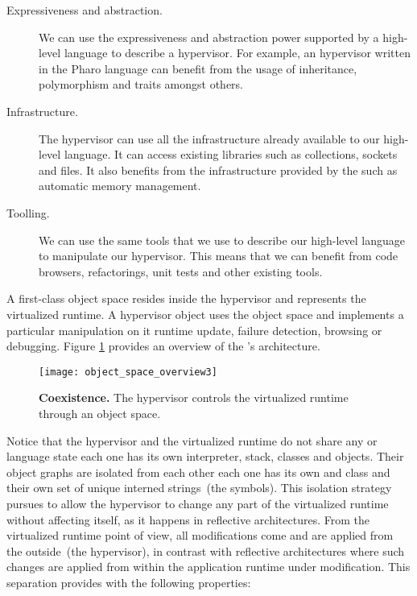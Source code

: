 \begin{description}
\item[Expressiveness and abstraction.] We can use the expressiveness and abstraction power supported by a high-level language to describe a hypervisor. For example, an hypervisor written in the Pharo language can benefit from the usage of inheritance, polymorphism and traits amongst others.
\item[Infrastructure.] The hypervisor can use all the infrastructure already available to our high-level language. It can access existing libraries such as collections, sockets and files. It also benefits from the infrastructure provided by the \VM such as automatic memory management.
\item[Toolling.] We can use the same tools that we use to describe our high-level language to manipulate our hypervisor. This means that we can benefit from code browsers, refactorings, unit tests and other existing tools.
\end{description}


A first-class object space resides inside the hypervisor and represents the virtualized runtime. A hypervisor object uses the object space and implements a particular manipulation on it \eg runtime update, failure detection, browsing or debugging. Figure \ref{fig:objectSpaceOverview_architecture} provides an overview of the \Vtt's architecture.

\begin{figure}[ht]
\begin{center}
\texttt{[image: object\_space\_overview3]}
\caption{\textbf{\VTT Coexistence.} The hypervisor controls the virtualized runtime through an object space.\label{fig:objectSpaceOverview_architecture}}
\end{center}
\end{figure}


Notice that the hypervisor and the virtualized runtime do not share any \VM or language state \ie each one has its own interpreter, stack, classes and objects. Their object graphs are isolated from each other \eg each one has its own  and  class and their own set of unique interned strings~(the symbols). This isolation strategy pursues to allow the hypervisor to change any part of the virtualized runtime without affecting itself, as it happens in reflective architectures. From the virtualized runtime point of view, all modifications come and are applied from the outside~(the hypervisor), in contrast with reflective architectures where such changes are applied from within the application runtime under modification. This separation provides \Vtt with the following properties:

